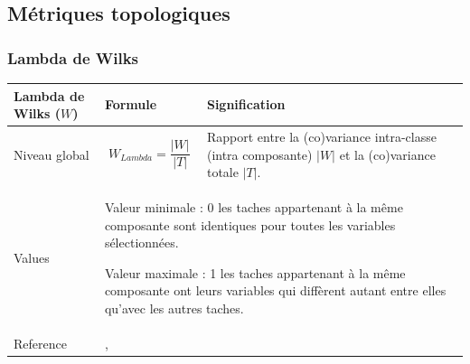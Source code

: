 \documentclass{article}
\begin{document}
\subsection{Métriques topologiques}

\subsubsection{Lambda de Wilks}
\label{metric_W}
\begin{table}[H]
	\begin{tabular}{|m{3.24cm}|m{4.4810004cm}m{7.924cm}|}
		\hline
		Lambda de Wilks ($W$) &
		\multicolumn{1}{m{4.4810004cm}|}{Formule} &
		Signification\\\hline
		Niveau global &
		\multicolumn{1}{m{4.4810004cm}|}{\begin{equation*}
			W_{Lambda}=\frac{|W|}{|T|}
			\end{equation*}
		} &
	Rapport entre la (co)variance intra-classe (intra composante) $|W|$ et la (co)variance totale $|T|$.
		
		\\\hline
		Values &
		\multicolumn{2}{m{12.6050005cm}|}{Valeur minimale : 0 les taches appartenant à la même composante sont identiques pour toutes les variables sélectionnées.
			
		Valeur maximale : 1 les taches appartenant à la même composante ont leurs variables qui diffèrent autant entre elles qu'avec les autres taches.
			
		}\\\hline
		Reference &
		\multicolumn{2}{m{12.6050005cm}|}{\cite{Everitt2001}, \cite{2017_clustering}}\\\hline
	\end{tabular}
\end{table}
\end{document}
